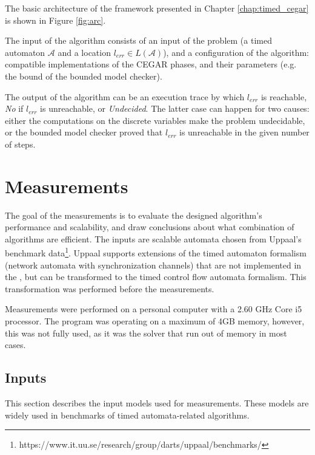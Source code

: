 The basic architecture of the framework presented in Chapter \ref{chap:timed_cegar} is shown in Figure \ref{fig:arc}.

The input of the algorithm consists of an input of the problem (a timed automaton $\mathcal{A}$ and a location $l_{err} \in L(\mathcal{A})$), and a configuration of the algorithm: compatible implementations of the CEGAR phases, and their parameters (e.g. the bound of the bounded model checker).

The output of the algorithm can be an execution trace by which $l_{err}$ is reachable, \emph{No} if $l_{err}$ is unreachable, or \emph{Undecided}. The latter case can happen for two causes: either the computations on the discrete variables make the problem undecidable, or the bounded model checker proved that $l_{err}$ is unreachable in the given number of steps. 



\section{Measurements}

The goal of the measurements is to evaluate the designed algorithm's performance and scalability, and draw conclusions about what combination of algorithms are efficient. The inputs are scalable automata chosen from Uppaal's benchmark data\footnote{https://www.it.uu.se/research/group/darts/uppaal/benchmarks/}. Uppaal supports extensions of the timed automaton formalism (network automata with synchronization channels) that are not implemented in the \ttmcfw, but can be transformed to the timed control flow automata formalism. This transformation was performed before the measurements.

Measurements were performed on a personal computer with a 2.60 GHz Core i5 processor. The program was operating on a maximum of 4GB memory, however, this was not fully used, as it was the solver that run out of memory in most cases.

\subsection{Inputs}

This section describes the input models used for measurements. These models are widely used in benchmarks of timed automata-related algorithms.

